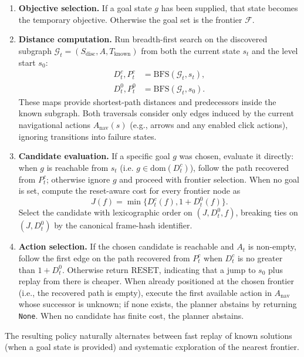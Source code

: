 \documentclass[11pt]{article}
\begin{document}
\begin{enumerate}
    \item \textbf{Objective selection.} If a goal state $g$ has been supplied, that state becomes the temporary objective. Otherwise the goal set is the frontier $\mathcal{F}$.
    \item \textbf{Distance computation.} Run breadth-first search on the discovered subgraph $\mathcal{G}_t = (S_{\mathrm{disc}}, A, T_{\mathrm{known}})$ from both the current state $s_t$ and the level start $s_0$:
    \begin{align}
    \label{eq:bfs-current}
    D_t^{c}, P_t^{c} &= \mathrm{BFS}(\mathcal{G}_t, s_t),\\
    \label{eq:bfs-reset}
    D_t^{0}, P_t^{0} &= \mathrm{BFS}(\mathcal{G}_t, s_0).
    \end{align}
    These maps provide shortest-path distances and predecessors inside the known subgraph. Both traversals consider only edges induced by the current navigational actions $A_{\mathrm{nav}}(s)$ (e.g., arrows and any enabled click actions), ignoring transitions into failure states.
    \item \textbf{Candidate evaluation.} If a specific goal $g$ was chosen, evaluate it directly: when $g$ is reachable from $s_t$ (i.e. $g \in \mathrm{dom}(D_t^{c})$), follow the path recovered from $P_t^{c}$; otherwise ignore $g$ and proceed with frontier selection. When no goal is set, compute the reset-aware cost for every frontier node as
    \begin{equation}
        \label{eq:cost}
        J(f) = \min\{ D_t^{c}(f), 1 + D_t^{0}(f) \}.
    \end{equation}
    Select the candidate with lexicographic order on $(J, D_t^{0}, f)$, breaking ties on $(J, D_t^{0})$ by the canonical frame-hash identifier.
    \item \textbf{Action selection.} If the chosen candidate is reachable and $A_t$ is non-empty, follow the first edge on the path recovered from $P_t^{c}$ when $D_t^{c}$ is no greater than $1 + D_t^{0}$. Otherwise return $\mathrm{RESET}$, indicating that a jump to $s_0$ plus replay from there is cheaper. When already positioned at the chosen frontier (i.e., the recovered path is empty), execute the first available action in $A_{\mathrm{nav}}$ whose successor is unknown; if none exists, the planner abstains by returning \texttt{None}. When no candidate has finite cost, the planner abstains.
\end{enumerate}

The resulting policy naturally alternates between fast replay of known solutions (when a goal state is provided) and systematic exploration of the nearest frontier.
\end{document}
